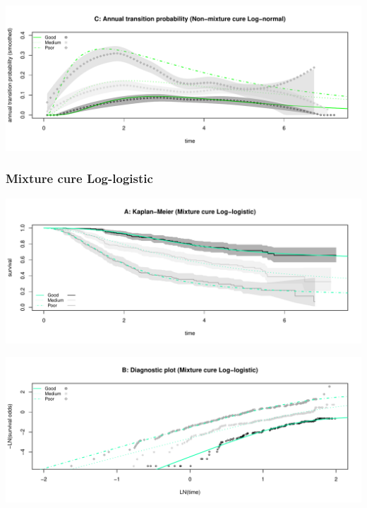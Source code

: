 \documentclass[
]{article}
\begin{document}
\begin{flushleft}\includegraphics[height=0.25\textheight]{BC_OS_output/Images/Figure_cure_models-12} \end{flushleft}

\clearpage

\subsubsection{Mixture cure
Log-logistic}\label{mixture-cure-log-logistic}

\begin{flushleft}\includegraphics[height=0.25\textheight]{BC_OS_output/Images/Figure_cure_models-13} \end{flushleft}

\begin{flushleft}\includegraphics[height=0.25\textheight]{BC_OS_output/Images/Figure_cure_models-14} \end{flushleft}
\end{document}
